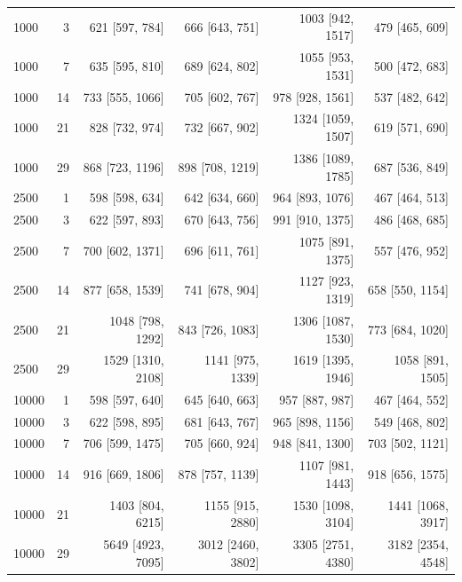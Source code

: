 \documentclass[journal,onecolumn,10pt]{IEEEtran}
\begin{document}
\begin{longtable}{@{}lrrrrr@{}}
1000 & 3 & 621 [597, 784] & 666 [643, 751] & 1003 [942, 1517] & 479 [465, 609] \\
1000 & 7 & 635 [595, 810] & 689 [624, 802] & 1055 [953, 1531] & 500 [472, 683] \\
1000 & 14 & 733 [555, 1066] & 705 [602, 767] & 978 [928, 1561] & 537 [482, 642] \\
1000 & 21 & 828 [732, 974] & 732 [667, 902] & 1324 [1059, 1507] & 619 [571, 690] \\
1000 & 29 & 868 [723, 1196] & 898 [708, 1219] & 1386 [1089, 1785] & 687 [536, 849] \\
2500 & 1 & 598 [598, 634] & 642 [634, 660] & 964 [893, 1076] & 467 [464, 513] \\
2500 & 3 & 622 [597, 893] & 670 [643, 756] & 991 [910, 1375] & 486 [468, 685] \\
2500 & 7 & 700 [602, 1371] & 696 [611, 761] & 1075 [891, 1375] & 557 [476, 952] \\
2500 & 14 & 877 [658, 1539] & 741 [678, 904] & 1127 [923, 1319] & 658 [550, 1154] \\
2500 & 21 & 1048 [798, 1292] & 843 [726, 1083] & 1306 [1087, 1530] & 773 [684, 1020] \\
2500 & 29 & 1529 [1310, 2108] & 1141 [975, 1339] & 1619 [1395, 1946] & 1058 [891, 1505] \\
10000 & 1 & 598 [597, 640] & 645 [640, 663] & 957 [887, 987] & 467 [464, 552] \\
10000 & 3 & 622 [598, 895] & 681 [643, 767] & 965 [898, 1156] & 549 [468, 802] \\
10000 & 7 & 706 [599, 1475] & 705 [660, 924] & 948 [841, 1300] & 703 [502, 1121] \\
10000 & 14 & 916 [669, 1806] & 878 [757, 1139] & 1107 [981, 1443] & 918 [656, 1575] \\
10000 & 21 & 1403 [804, 6215] & 1155 [915, 2880] & 1530 [1098, 3104] & 1441 [1068, 3917] \\
10000 & 29 & 5649 [4923, 7095] & 3012 [2460, 3802] & 3305 [2751, 4380] & 3182 [2354, 4548] \\
\end{longtable}
\endgroup
\end{document}
